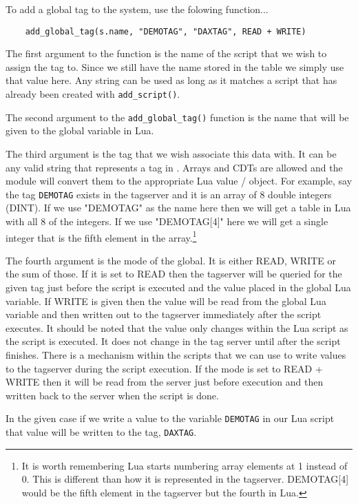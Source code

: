 To add a global tag to the system, use the folowing function...

\begin{verbatim}
	add_global_tag(s.name, "DEMOTAG", "DAXTAG", READ + WRITE)
\end{verbatim}

The first argument to the function is the name of the script that we wish to assign the tag to.
Since we still have the name stored in the table we simply use that value here.  Any string can
be used as long as it matches a script that has already been created with \texttt{add\_script()}.

The second argument to the \texttt{add\_global\_tag()} function is the name that will be given to
the global variable in Lua.

The third argument is the \opendax tag that we wish associate this data with.  It can be any
valid string that represents a tag in \opendax.  Arrays and CDTs are allowed and the module
will convert them to the appropriate Lua value / object.  For example, say the tag \texttt{DEMOTAG}
exists in the tagserver and it is an array of 8 double integers (DINT).  If we use "DEMOTAG" as the
name here then we will get a table in Lua with all 8 of the integers.  If we use "DEMOTAG[4]" here
we will get a single integer that is the fifth element in the array.\footnote{It is worth remembering
Lua starts numbering array elements at 1 instead of 0.  This is different than how it is represented in
the tagserver.  DEMOTAG[4] would be the fifth element in the tagserver but the fourth in Lua.}

The fourth argument is the mode of the global.  It is either READ, WRITE or the sum of those.  If
it is set to READ then the tagserver will be queried for the given tag just before the script
is executed and the value placed in the global Lua variable.  If WRITE is given then the value
will be read from the global Lua variable and then written out to the tagserver immediately after
the script executes.  It should be noted that the value only changes within the Lua script as
the script is executed.  It does not change in the tag server until after the script finishes.
There is a mechanism within the scripts that we can use to write values to the tagserver during
the script execution.  If the mode is set to READ + WRITE then it will be read from the server
just before execution and then written back to the server when the script is done.

In the given case if we write a value to the variable \texttt{DEMOTAG} in our Lua script
that value will be written to the \opendax tag, \texttt{DAXTAG}.

